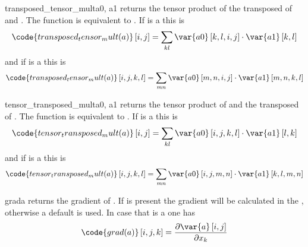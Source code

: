 \begin{funcdesc}{transposed_tensor_mult}{a0, a1}
returns the tensor product of the transposed of  and .
The function is equivalent to .
If  is a \RankTwo this is
\begin{equation}
\code{transposed_tensor_mult(a)}\left[i,j\right]=\sum_{kl}\var{a0}\left[k,l,i,j\right] \cdot \var{a1} \left[k,l\right]
\end{equation}
and if  is a \RankFour this is
\begin{equation}
\code{transposed_tensor_mult(a)}\left[i,j,k,l\right]=\sum_{mn}\var{a0} \left[m,n,i,j\right] \cdot \var{a1} \left[m,n,k,l\right]
\end{equation}
\end{funcdesc}

\begin{funcdesc}{tensor_transposed_mult}{a0, a1}
returns the tensor product of  and the transposed of .
The function is equivalent to .
If  is a \RankTwo this is
\begin{equation}
\code{tensor_transposed_mult(a)}\left[i,j\right]=\sum_{kl}\var{a0}\left[i,j,k,l\right] \cdot \var{a1} \left[l,k\right]
\end{equation}
and if  is a \RankFour this is
\begin{equation}
\code{tensor_transposed_mult(a)}\left[i,j,k,l\right]=\sum_{mn}\var{a0} \left[i,j,m,n\right] \cdot \var{a1} \left[k,l,m,n\right]
\end{equation}
\end{funcdesc}

\begin{funcdesc}{grad}{a}
returns the gradient of . If  is present the gradient will
be calculated in the \FunctionSpace {}, otherwise a default
\FunctionSpace is used. In case that  is a \RankTwo one has
\begin{equation}
\code{grad(a)}\left[i,j,k\right]=\frac{\partial \var{a} \left[i,j\right]}{\partial x_{k}}
\end{equation}
\end{funcdesc}

